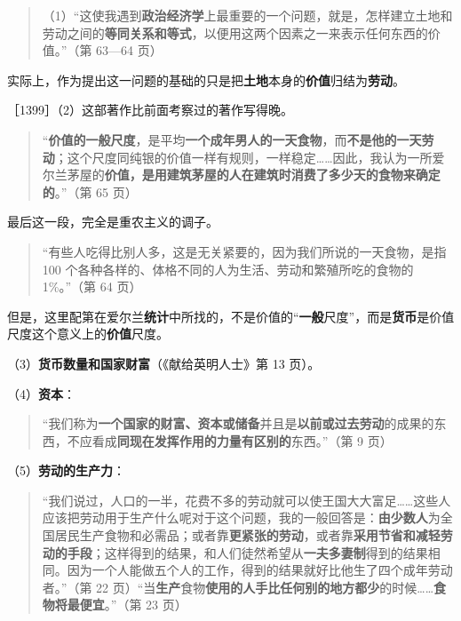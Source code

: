\begin{quote}（1）“这使我遇到\textbf{政治经济学}上最重要的一个问题，就是，怎样建立土地和劳动之间的\textbf{等同关系和等式}，以便用这两个因素之一来表示任何东西的价值。”（第 63—64 页）\end{quote}

实际上，作为提出这一问题的基础的只是把\textbf{土地}本身的\textbf{价值}归结为\textbf{劳动}。

［1399］（2）这部著作比前面考察过的著作写得晚。

\begin{quote}“\textbf{价值的一般尺度}，是平均\textbf{一个成年男人的一天食物}，而\textbf{不是他的一天劳动}；这个尺度同纯银的价值一样有规则，一样稳定……因此，我认为一所爱尔兰茅屋的\textbf{价值，是用建筑茅屋的人在建筑时消费了多少天的食物来确定的}。”（第 65 页）\end{quote}

最后这一段，完全是重农主义的调子。

\begin{quote}“有些人吃得比别人多，这是无关紧要的，因为我们所说的一天食物，是指 100 个各种各样的、体格不同的人为生活、劳动和繁殖所吃的食物的 1\%。”（第 64 页）\end{quote}

但是，这里配第在爱尔兰\textbf{统计}中所找的，不是价值的“\textbf{一般}尺度”，而是\textbf{货币}是价值尺度这个意义上的\textbf{价值}尺度。

（3）\textbf{货币数量和国家财富}（《献给英明人士》第 13 页）。

（4）\textbf{资本}：

\begin{quote}“我们称为\textbf{一个国家的财富、资本或储备}并且是\textbf{以前或过去劳动}的成果的东西，不应看成\textbf{同现在发挥作用的力量有区别的}东西。”（第 9 页）\end{quote}

（5）\textbf{劳动的生产力}：

\begin{quote}“我们说过，人口的一半，花费不多的劳动就可以使王国大大富足……这些人应该把劳动用于生产什么呢对于这个问题，我的一般回答是：\textbf{由少数人}为全国居民生产食物和必需品；或者靠\textbf{更紧张的劳动}，或者靠\textbf{采用节省和减轻劳动的手段}；这样得到的结果，和人们徒然希望从\textbf{一夫多妻制}得到的结果相同。因为一个人能做五个人的工作，得到的结果就好比他生了四个成年劳动者。”（第 22 页）“当\textbf{生产}食物\textbf{使用的人手比任何别的地方都少}的时候……\textbf{食物将最便宜}。”（第 23 页）\end{quote}

